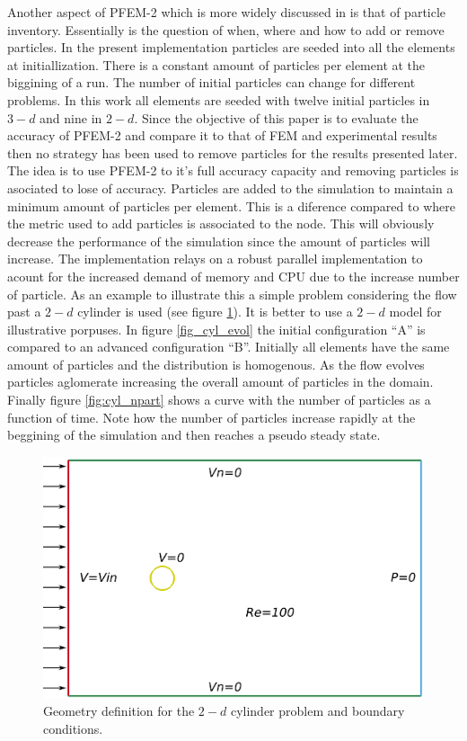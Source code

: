 Another aspect of PFEM-2 which is more widely discussed in \cite{gimenez-difusion} is that of particle inventory. Essentially is the question of when, where and how to add or remove particles. In the present implementation particles are seeded into all the elements at initiallization. There is a constant amount of particles per element at the biggining of a run. The number of initial particles can change for different problems. In this work all elements are seeded with twelve initial particles in $3-d$ and nine in $2-d$. Since the objective of this paper is to evaluate the accuracy of PFEM-2 and compare it to that of FEM and experimental results then no strategy has been used to remove particles for the results presented later. The idea is to use PFEM-2 to it's full accuracy capacity and removing particles is asociated to lose of accuracy. Particles are added to the simulation to maintain a minimum amount of particles per element. This is a diference compared to \cite{gimenez-difusion} where the metric used to add particles is associated to the node. This will obviously decrease the performance of the simulation since the amount of particles will increase. The implementation relays on a robust parallel implementation to acount for the increased demand of memory and CPU due to the increase number of particle. As an example to illustrate this a simple problem considering the flow past a $2-d$ cylinder is used (see figure \ref{fig:cyl_def}). It is better to use a $2-d$ model for illustrative porpuses. In figure \ref{fig_cyl_evol} the initial configuration ``A'' is compared to an advanced configuration ``B''. Initially all elements have the same amount of particles and the distribution is homogenous. As the flow evolves particles aglomerate increasing the overall amount of particles in the domain. Finally figure \ref{fig:cyl_npart} shows a curve with the number of particles as a function of time. Note how the number of particles increase rapidly at the beggining of the simulation and then reaches a pseudo steady state.


\begin{figure}[htp] 
\centering 
\includegraphics[scale=.5]{./imgs/cyl_def.png}
\caption{Geometry definition for the $2-d$ cylinder problem and boundary conditions.}
\label{fig:cyl_def}
\end{figure}

